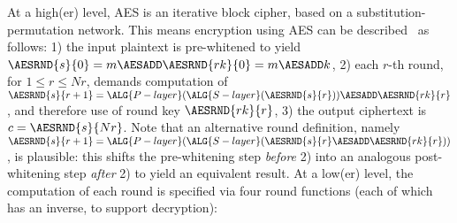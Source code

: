 At a high(er) level, 
AES is an iterative block cipher, based on a substitution-permutation network.
This means encryption using AES can be described~\cite[Section 5.2]{FIPS:197}
as follows:
1)    the  input  plaintext is pre-whitened to yield
      $\AESRND {s}{  0} = m \AESADD \AESRND{rk}{0} = m \AESADD k$,
2)    each $r$-th round, for $1 \leq r \leq Nr$, demands computation of
      $\AESRND {s}{r+1} = \ALG{P-layer}( \ALG{S-layer}( \AESRND{s}{r}                        ) ) \AESADD \AESRND{rk}{r}$,
      and therefore use of round key
      $\AESRND{rk}{r  }$,
3)    the output ciphertext is
      $c = \AESRND{s}{Nr}$.
Note that an alternative round definition, namely
      $\AESRND {s}{r+1} = \ALG{P-layer}( \ALG{S-layer}( \AESRND{s}{r} \AESADD \AESRND{rk}{r} ) )                       $ ,
is plausible: this shifts the 
 pre-whitening step {\em before} 2) 
into an analogous 
post-whitening step {\em  after} 2)
to yield an equivalent result.
At a  low(er) level,
the computation of each round is specified via four round functions (each of 
which has an inverse, to support decryption):

